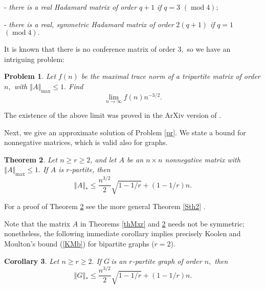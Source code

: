 \documentclass[12pt]{article}%
\newtheorem{theorem}{Theorem}[section]
\newtheorem{corollary}[theorem]{Corollary}
\newtheorem{problem}[theorem]{Problem}
\begin{document}
- \emph{there is a real Hadamard matrix of order }$q+1$\emph{ if }$q=3$\emph{
}$\left(  \operatorname{mod}4\right)  $;

- \emph{there is a real, symmetric Hadamard matrix of order }$2\left(
q+1\right)  $\emph{ if }$q=1$\emph{ }$\left(  \operatorname{mod}4\right)
.$\medskip

It is known that there is no conference matrix of order $3,$ so we have an
intriguing problem:

\begin{problem}
Let $f\left(  n\right)  $ be the maximal trace norm of a tripartite matrix of
order $n,$ with $\left\Vert A\right\Vert _{\max}\leq1.$ Find%
\[
\lim_{n\rightarrow\infty}f\left(  n\right)  n^{-3/2}.
\]

\end{problem}

The existence of the above limit was proved in the ArXiv version of
\cite{Nik15a}.\medskip

Next, we give an approximate solution of Problem \ref{pr}. We state a bound
for nonnegative matrices, which is valid also for graphs.

\begin{theorem}
\label{th2}Let $n\geq r\geq2$, and let $A$ be an $n\times n$ nonnegative
matrix with $\left\Vert A\right\Vert _{\max}\leq1.$ If $A$ is $r$-partite,
then
\begin{equation}
\left\Vert A\right\Vert _{\ast}\leq\frac{n^{3/2}}{2}\sqrt{1-1/r}+\left(
1-1/r\right)  n. \label{nnb}%
\end{equation}

\end{theorem}

For a proof of Theorem \ref{th2} see the more general Theorem \ref{Sth2}%
.\medskip

Note that the matrix $A$ in Theorems \ref{thMxr} and \ref{th2} needs not be
symmetric; nonetheless, the following immediate corollary implies precisely
Koolen and Moulton's bound (\ref{KMb}) for bipartite graphs ($r=2$).

\begin{corollary}
\label{cor1}Let $n\geq r\geq2.$ If $G\ $is an $r$-partite graph of order $n,$
then
\begin{equation}
\left\Vert G\right\Vert _{\ast}\leq\frac{n^{3/2}}{2}\sqrt{1-1/r}+\left(
1-1/r\right)  n. \label{eab}%
\end{equation}

\end{corollary}
\end{document}
